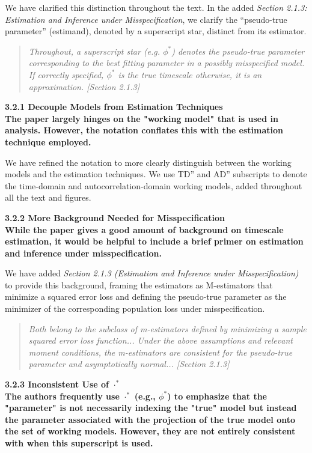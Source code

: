 \documentclass[docs/main.tex]{subfiles}
\newcommand{\reviewercomment}[1]{\vspace{0.3cm}\noindent\textbf{#1}\vspace{0.15cm}}
\newcommand{\manuscriptquote}[1]{\begin{quote}\textit{#1}\end{quote}}
\begin{document}
We have clarified this distinction throughout the text. In the added \textit{Section 2.1.3: Estimation and Inference under Misspecification}, we clarify the ``pseudo-true parameter'' (estimand), denoted by a superscript star, distinct from its estimator.

\manuscriptquote{Throughout, a superscript star (e.g. $\phi^\ast$) denotes the pseudo-true parameter corresponding to the best fitting parameter in a possibly misspecified model. If correctly specified, $\phi^\ast$ is the true timescale otherwise, it is an approximation. [Section 2.1.3]}

\reviewercomment{3.2.1 Decouple Models from Estimation Techniques\\
The paper largely hinges on the "working model" that is used in analysis. However, the notation conflates this with the estimation technique employed.}

We have refined the notation to more clearly distinguish between the working models and the estimation techniques. We use TD'' and AD'' subscripts to denote the time-domain and autocorrelation-domain working models, added throughout all the text and figures.

\reviewercomment{3.2.2 More Background Needed for Misspecification\\
While the paper gives a good amount of background on timescale estimation, it would be helpful to include a brief primer on estimation and inference under misspecification.}

We have added \textit{Section 2.1.3 (Estimation and Inference under Misspecification)} to provide this background, framing the estimators as M-estimators that minimize a squared error loss and defining the pseudo-true parameter as the minimizer of the corresponding population loss under misspecification.

\manuscriptquote{Both belong to the subclass of m-estimators defined by minimizing a sample squared error loss function... Under the above assumptions and relevant moment conditions, the m-estimators are consistent for the pseudo-true parameter and asymptotically normal... [Section 2.1.3]}

\reviewercomment{3.2.3 Inconsistent Use of $\cdot^\ast$\\
The authors frequently use $\cdot^\ast$ (e.g., $\phi^\ast$) to emphasize that the "parameter" is not necessarily indexing the "true" model but instead the parameter associated with the projection of the true model onto the set of working models. However, they are not entirely consistent with when this superscript is used.}
\end{document}
